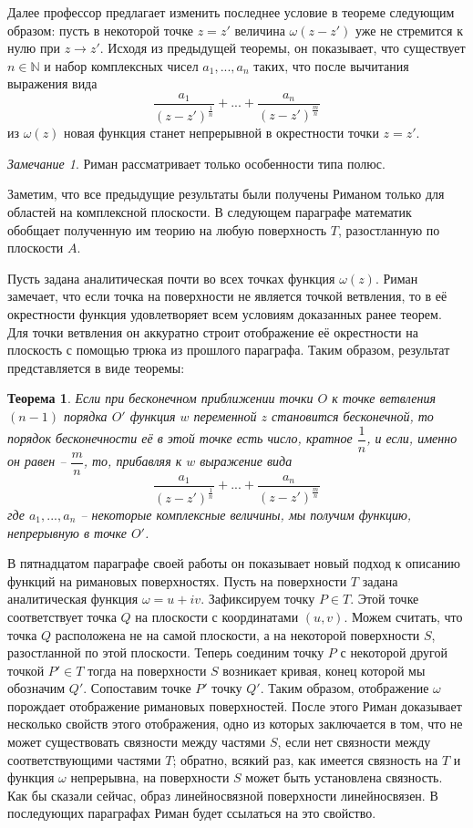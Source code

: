 \documentclass[a4paper,12pt]{article}
\newtheorem*{theorem}{Теорема}
\theoremstyle{remark}
\newtheorem*{remark}{Замечание}
\begin{document}
Далее профессор предлагает изменить последнее условие в теореме следующим образом:
пусть в некоторой точке $z = z'$ величина $\omega (z - z')$ уже не стремится к нулю при $z\rightarrow z'$.
Исходя из предыдущей теоремы, он показывает, что существует $n \in \mathbb{N}$ и набор комплексных чисел $a_1, ..., a_n$ таких,
что после вычитания выражения вида
\[\dfrac{a_1}{(z-z')^{\frac{1}{n}}}+ ...+ \dfrac{a_n}{(z-z')^{\frac{m}{n}}}\]
из $\omega(z)$ новая функция станет непрерывной в окрестности точки $z = z'$.
\begin{remark}
  Риман рассматривает только особенности типа полюс.
\end{remark}

Заметим, что все предыдущие результаты были получены Риманом только для областей на комплексной
плоскости. В следующем параграфе математик обобщает полученную им
теорию на любую поверхность $T$, разостланную по плоскости $A$.

Пусть задана аналитическая почти во всех точках функция
$\omega(z)$. Риман замечает, что если точка на поверхности не является точкой ветвления, то в её
окрестности функция удовлетворяет всем условиям доказанных ранее теорем.
Для точки ветвления он аккуратно строит отображение её окрестности на плоскость с помощью трюка из прошлого параграфа.
Таким образом, результат представляется в виде теоремы:
\begin{theorem}
  Если при бесконечном приближении точки $O$ к точке ветвления $(n-1)$ порядка
  $O'$ функция $w$ переменной $z$ становится бесконечной, то
  порядок бесконечности её в этой точке есть число, кратное $\dfrac{1}{n}$, и если,
  именно он равен -- $\dfrac{m}{n}$, то, прибавляя к $w$ выражение вида
  \[\dfrac{a_1}{(z-z')^{\frac{1}{n}}}+ ...+ \dfrac{a_n}{(z-z')^{\frac{m}{n}}}\]
  где $a_1, ..., a_n$ -- некоторые комплексные величины, мы получим
  функцию, непрерывную в точке $O'$.
\end{theorem}

В пятнадцатом параграфе своей работы он показывает новый подход к описанию функций на римановых поверхностях. Пусть на поверхности $T$ задана аналитическая функция $\omega = u + iv$.
Зафиксируем точку $P \in T$. Этой точке соответствует точка $Q$ на плоскости с координатами
$(u, v)$. Можем считать, что точка $Q$ расположена не на самой плоскости, а на некоторой поверхности $S$, разостланной по этой плоскости. Теперь соединим точку $P$ с некоторой другой точкой
$P' \in T$ тогда на поверхности $S$ возникает кривая, конец которой мы обозначим $Q'$. Сопоставим точке $P'$ точку $Q'$. Таким образом, отображение $\omega$ порождает отображение римановых
поверхностей. После этого Риман доказывает несколько свойств этого отображения, одно из которых заключается в том, что
не может существовать связности между частями $S$, если нет связности между соответствующими частями $T$; обратно, всякий раз, как имеется связность на $T$ и функция $\omega$
непрерывна, на поверхности $S$ может быть установлена связность.
Как бы сказали сейчас, образ линейносвязной поверхности линейносвязен.
В последующих параграфах Риман будет ссылаться на это свойство.
\end{document}
